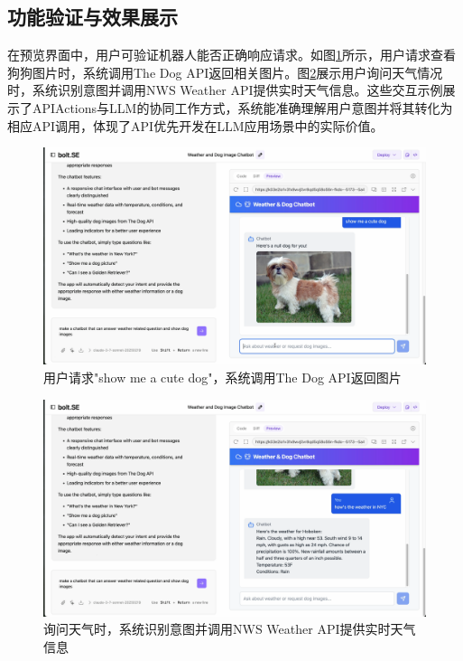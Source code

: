 \subsection{功能验证与效果展示}

在预览界面中，用户可验证机器人能否正确响应请求。如图\ref{fig:demo_dog}所示，用户请求查看狗狗图片时，系统调用The Dog API返回相关图片。图\ref{fig:demo_weather}展示用户询问天气情况时，系统识别意图并调用NWS Weather API提供实时天气信息。这些交互示例展示了APIActions与LLM的协同工作方式，系统能准确理解用户意图并将其转化为相应API调用，体现了API优先开发在LLM应用场景中的实际价值。

\begin{figure}[htbp]
  \centering
  \includegraphics[width=\textwidth]{figures/screenshots/api-actions/demo_dog_preview.png}
  \caption{用户请求"show me a cute dog"，系统调用The Dog API返回图片}
  \label{fig:demo_dog}
\end{figure}

\begin{figure}[htbp]
  \centering
  \includegraphics[width=\textwidth]{figures/screenshots/api-actions/demo_weather_preview.png}
  \caption{询问天气时，系统识别意图并调用NWS Weather API提供实时天气信息}
  \label{fig:demo_weather}
\end{figure}